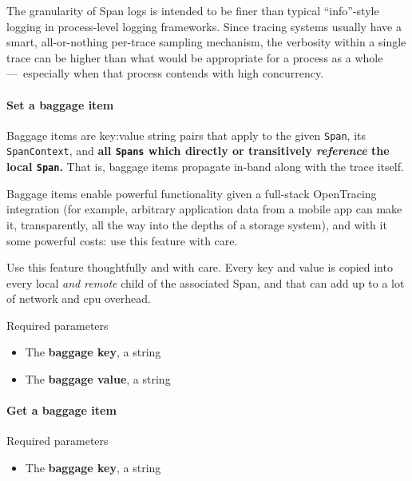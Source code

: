 \documentclass[a4paper,12pt,notitlepage,twoside,openright]{article}
\begin{document}
The granularity of Span logs is intended to be finer than typical
``info''-style logging in process-level logging frameworks. Since
tracing systems usually have a smart, all-or-nothing per-trace sampling
mechanism, the verbosity within a single trace can be higher than what
would be appropriate for a process as a whole ---~especially when that
process contends with high concurrency.

\hypertarget{set-a-baggage-item}{%
\paragraph{\texorpdfstring{Set a \textbf{baggage}
item}{Set a baggage item}}\label{set-a-baggage-item}}

Baggage items are key:value string pairs that apply to the given
\texttt{Span}, its \texttt{SpanContext}, and \textbf{all \texttt{Spans}
which directly or transitively \emph{reference} the local
\texttt{Span}.} That is, baggage items propagate in-band along with the
trace itself.

Baggage items enable powerful functionality given a full-stack
OpenTracing integration (for example, arbitrary application data from a
mobile app can make it, transparently, all the way into the depths of a
storage system), and with it some powerful costs: use this feature with
care.

Use this feature thoughtfully and with care. Every key and value is
copied into every local \emph{and remote} child of the associated Span,
and that can add up to a lot of network and cpu overhead.

Required parameters

\begin{itemize}

\item
  The \textbf{baggage key}, a string
\item
  The \textbf{baggage value}, a string
\end{itemize}

\hypertarget{get-a-baggage-item}{%
\paragraph{\texorpdfstring{Get a \textbf{baggage}
item}{Get a baggage item}}\label{get-a-baggage-item}}

Required parameters

\begin{itemize}

\item
  The \textbf{baggage key}, a string
\end{itemize}
\end{document}
